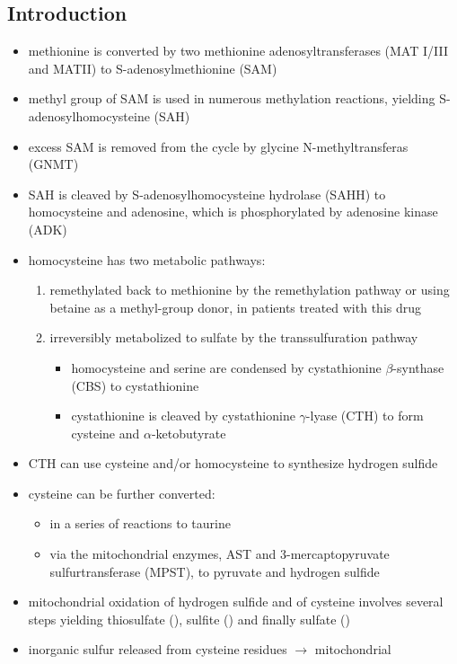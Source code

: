 \documentclass{scrartcl}
\begin{document}
\subsection{Introduction}
\label{sec:orgdabff8f}
\begin{itemize}
\item methionine is converted by two methionine adenosyltransferases (MAT
I/III and MATII) to S-adenosylmethionine (SAM)
\item methyl group of SAM is used in numerous methylation reactions,
yielding S-adenosylhomocysteine (SAH)
\item excess SAM is removed from the cycle by glycine N-methyltransferas (GNMT)
\item SAH is cleaved by S-adenosylhomocysteine hydrolase (SAHH) to
homocysteine and adenosine, which is phosphorylated by adenosine
kinase (ADK)
\item homocysteine has two metabolic pathways:
\begin{enumerate}
\item remethylated back to methionine by the remethylation pathway or
using betaine as a methyl-group donor, in patients treated with
this drug
\item irreversibly metabolized to sulfate
by the transsulfuration pathway
\begin{itemize}
\item homocysteine and serine are condensed by cystathionine
\(\beta\)-synthase (CBS) to cystathionine
\item cystathionine is cleaved by cystathionine \(\gamma\)-lyase (CTH) to
form cysteine and \(\alpha\)-ketobutyrate
\end{itemize}
\end{enumerate}
\item CTH can use cysteine and/or homocysteine to synthesize hydrogen
sulfide
\item cysteine can be further converted:
\begin{itemize}
\item in a series of reactions to taurine
\item via the mitochondrial enzymes, AST and 3-mercaptopyruvate
sulfurtransferase (MPST), to pyruvate and hydrogen sulfide
\end{itemize}
\item mitochondrial oxidation of hydrogen sulfide and of cysteine involves
several steps yielding thiosulfate (), sulfite
() and finally sulfate ()
\item inorganic sulfur released from cysteine residues \(\to\) mitochondrial

\end{itemize}
\end{document}
